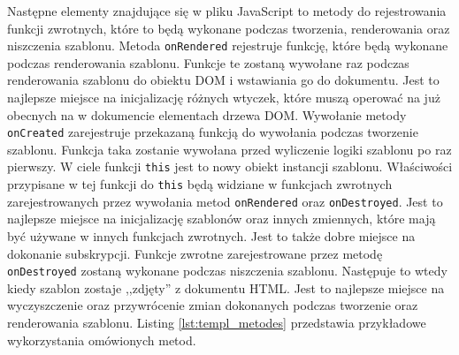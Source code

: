 Następne elementy znajdujące się w pliku JavaScript to metody do rejestrowania funkcji zwrotnych, które to będą wykonane podczas tworzenia, renderowania oraz niszczenia szablonu. Metoda \verb|onRendered| rejestruje funkcję, które będą wykonane podczas renderowania szablonu. Funkcje te zostaną wywołane raz podczas renderowania szablonu do obiektu DOM i wstawiania go do dokumentu. Jest to najlepsze miejsce na inicjalizację różnych wtyczek, które muszą operować na już obecnych na w dokumencie elementach drzewa DOM. \newline
Wywołanie metody \verb|onCreated| zarejestruje przekazaną funkcją do wywołania podczas tworzenie szablonu. Funkcja taka zostanie wywołana przed wyliczenie logiki szablonu po raz pierwszy. W ciele funkcji \verb|this| jest to nowy obiekt instancji szablonu. Właściwości przypisane w tej funkcji do \verb|this| będą widziane w funkcjach zwrotnych zarejestrowanych przez wywołania metod \verb|onRendered| oraz \verb|onDestroyed|. Jest to najlepsze miejsce na inicjalizację szablonów oraz innych zmiennych, które mają być używane w innych funkcjach zwrotnych. Jest to także dobre miejsce na dokonanie subskrypcji. \newline
Funkcje zwrotne zarejestrowane przez metodę \verb|onDestroyed| zostaną wykonane podczas niszczenia szablonu. Następuje to wtedy kiedy szablon zostaje ,,zdjęty'' z dokumentu HTML. Jest to najlepsze miejsce na wyczyszczenie oraz przywrócenie zmian dokonanych podczas tworzenie oraz renderowania szablonu. Listing \ref{lst:templ_metodes} przedstawia przykładowe wykorzystania omówionych metod.
